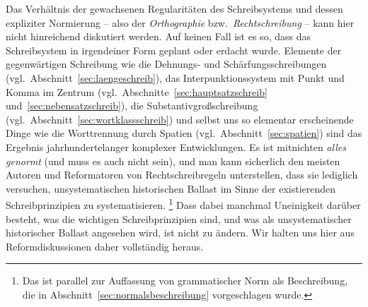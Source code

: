 Das Verhältnis der gewachsenen Regularitäten des Schreibsystems und dessen expliziter Normierung -- also der \textit{Orthographie} bzw.\ \textit{Rechtschreibung} -- kann hier nicht hinreichend diskutiert werden.
Auf keinen Fall ist es so, dass das Schreibsystem in irgendeiner Form geplant oder erdacht wurde.
Elemente der gegenwärtigen Schreibung wie die Dehnungs- und Schärfungsschreibungen (vgl.\ Abschnitt~\ref{sec:laengeschreib}), das Interpunktionssystem mit Punkt und Komma im Zentrum (vgl.\ Abschnitte~\ref{sec:hauptsatzschreib} und~\ref{sec:nebensatzschreib}), die Substantivgroßschreibung (vgl.\ Abschnitt~\ref{sec:wortklassschreib}) und selbst uns so elementar erscheinende Dinge wie die Worttrennung durch Spatien (vgl.\ Abschnitt~\ref{sec:spatien}) sind das Ergebnis jahrhundertelanger komplexer Entwicklungen.
Es ist mitnichten \textit{alles genormt} (und muss es auch nicht sein), und man kann sicherlich den meisten Autoren und Reformatoren von Rechtschreibregeln unterstellen, dass sie lediglich versuchen, unsystematischen historischen Ballast im Sinne der existierenden Schreibprinzipien zu systematisieren.%
\footnote{Das ist parallel zur Auffassung von grammatischer Norm als Beschreibung, die in Abschnitt~\ref{sec:normalsbeschreibung} vorgeschlagen wurde.}
Dass dabei manchmal Uneinigkeit darüber besteht, was die wichtigen Schreibprinzipien sind, und was als unsystematischer historischer Ballast angesehen wird, ist nicht zu ändern.
Wir halten uns hier aus Reformdiskussionen daher vollständig heraus.

